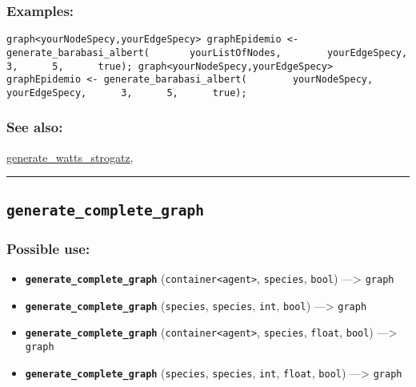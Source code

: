 \documentclass[]{book}
\providecommand{\tightlist}{%
  \setlength{\itemsep}{0pt}\setlength{\parskip}{0pt}}
\theoremstyle{definition}
\theoremstyle{definition}
\theoremstyle{definition}
\theoremstyle{remark}
\begin{document}
\subsubsection{Examples:}\label{examples-136}

\begin{verbatim}
graph<yourNodeSpecy,yourEdgeSpecy> graphEpidemio <- generate_barabasi_albert(       yourListOfNodes,        yourEdgeSpecy,      3,      5,      true); graph<yourNodeSpecy,yourEdgeSpecy> graphEpidemio <- generate_barabasi_albert(        yourNodeSpecy,      yourEdgeSpecy,      3,      5,      true); 
\end{verbatim}

\subsubsection{See also:}\label{see-also-103}

\href{operators-d-to-h.html\#generate_watts_strogatz}{generate\_watts\_strogatz},

\begin{center}\rule{0.5\linewidth}{\linethickness}\end{center}

\subsection{\texorpdfstring{\texttt{generate\_complete\_graph}}{generate\_complete\_graph}}\label{generate_complete_graph}

\subsubsection{Possible use:}\label{possible-use-187}

\begin{itemize}
\tightlist
\item
  \textbf{\texttt{generate\_complete\_graph}}
  (\texttt{container\textless{}agent\textgreater{}}, \texttt{species},
  \texttt{bool}) ---\textgreater{} \texttt{graph}
\item
  \textbf{\texttt{generate\_complete\_graph}} (\texttt{species},
  \texttt{species}, \texttt{int}, \texttt{bool}) ---\textgreater{}
  \texttt{graph}
\item
  \textbf{\texttt{generate\_complete\_graph}}
  (\texttt{container\textless{}agent\textgreater{}}, \texttt{species},
  \texttt{float}, \texttt{bool}) ---\textgreater{} \texttt{graph}
\item
  \textbf{\texttt{generate\_complete\_graph}} (\texttt{species},
  \texttt{species}, \texttt{int}, \texttt{float}, \texttt{bool})
  ---\textgreater{} \texttt{graph}
\end{itemize}
\end{document}
